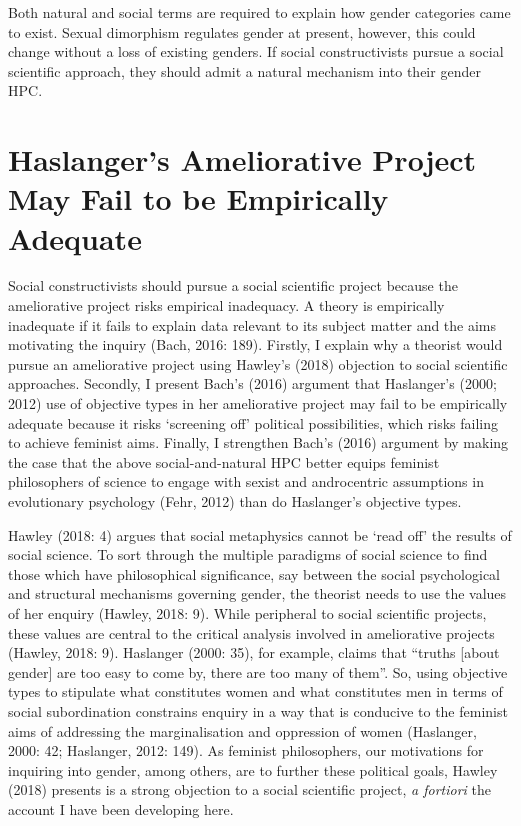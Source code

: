 Both natural and social terms are required to explain how gender
categories came to exist. Sexual dimorphism regulates gender at present,
however, this could change without a loss of existing genders. If social
constructivists pursue a social scientific approach, they should admit a
natural mechanism into their gender HPC.

\section*{Haslanger's Ameliorative Project May Fail to be Empirically Adequate}

Social constructivists should pursue a social scientific project because
the ameliorative project risks empirical inadequacy. A theory is
empirically inadequate if it fails to explain data relevant to its
subject matter and the aims motivating the inquiry (Bach, 2016: 189).
Firstly, I explain why a theorist would pursue an ameliorative project
using Hawley's (2018) objection to social scientific approaches.
Secondly, I present Bach's (2016) argument that Haslanger's (2000; 2012)
use of objective types in her ameliorative project may fail to be
empirically adequate because it risks `screening off' political
possibilities, which risks failing to achieve feminist aims. Finally, I
strengthen Bach's (2016) argument by making the case that the above
social-and-natural HPC better equips feminist philosophers of science to
engage with sexist and androcentric assumptions in evolutionary
psychology (Fehr, 2012) than do Haslanger's objective types.

Hawley (2018: 4) argues that social metaphysics cannot be `read off' the
results of social science. To sort through the multiple paradigms of
social science to find those which have philosophical significance, say
between the social psychological and structural mechanisms governing
gender, the theorist needs to use the values of her enquiry (Hawley,
2018: 9). While peripheral to social scientific projects, these values
are central to the critical analysis involved in ameliorative projects
(Hawley, 2018: 9). Haslanger (2000: 35), for example, claims that
``truths {[}about gender{]} are too easy to come by, there are too many
of them''. So, using objective types to stipulate what constitutes women
and what constitutes men in terms of social subordination constrains
enquiry in a way that is conducive to the feminist aims of addressing
the marginalisation and oppression of women (Haslanger, 2000: 42;
Haslanger, 2012: 149). As feminist philosophers, our motivations for
inquiring into gender, among others, are to further these political
goals, Hawley (2018) presents is a strong objection to a social
scientific project, \emph{a fortiori} the account I have been developing
here.

